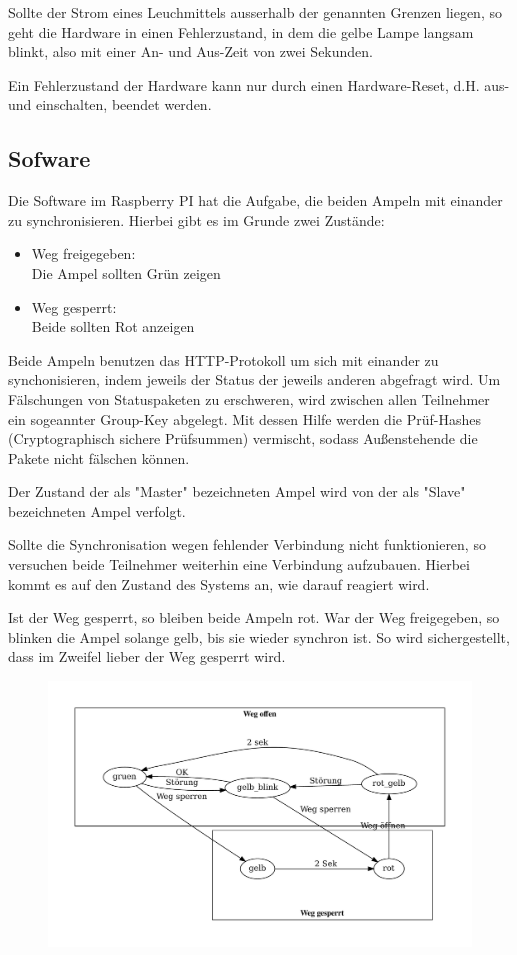 \documentclass[a4paper, ngerman]{scrartcl}
\begin{document}
Sollte der Strom eines Leuchmittels ausserhalb der genannten Grenzen liegen, so geht die Hardware in einen Fehlerzustand, in dem die gelbe Lampe langsam blinkt, also mit einer An- und Aus-Zeit von zwei Sekunden.

Ein Fehlerzustand der Hardware kann nur durch einen Hardware-Reset, d.H. aus- und einschalten, beendet werden.

\subsection{Sofware}
Die Software im Raspberry PI hat die Aufgabe, die beiden Ampeln mit einander zu synchronisieren. Hierbei gibt es im Grunde zwei Zustände:
\begin{itemize}
	\item Weg freigegeben:\\
		Die Ampel sollten Grün zeigen
	\item Weg gesperrt:\\
		Beide sollten Rot anzeigen
\end{itemize}

Beide Ampeln benutzen das HTTP-Protokoll um sich mit einander zu synchonisieren, indem jeweils der Status der jeweils anderen abgefragt wird. Um Fälschungen von Statuspaketen zu erschweren, wird zwischen allen Teilnehmer ein sogeannter Group-Key abgelegt. Mit dessen Hilfe werden die Prüf-Hashes (Cryptographisch sichere Prüfsummen) vermischt, sodass Außenstehende die Pakete nicht fälschen können.

Der Zustand der als "Master" bezeichneten Ampel wird von der als "Slave" bezeichneten Ampel verfolgt. 

Sollte die Synchronisation wegen fehlender Verbindung nicht funktionieren, so versuchen beide Teilnehmer weiterhin eine Verbindung aufzubauen. Hierbei kommt es auf den Zustand des Systems an, wie darauf reagiert wird.

Ist der Weg gesperrt, so bleiben beide Ampeln rot. War der Weg freigegeben, so blinken die Ampel solange gelb, bis sie wieder synchron ist. So wird sichergestellt, dass im Zweifel lieber der Weg gesperrt wird.

\begin{figure}
	\includegraphics[keepaspectratio, width=\textwidth]{system_statemachine.pdf}
\end{figure}
\end{document}
